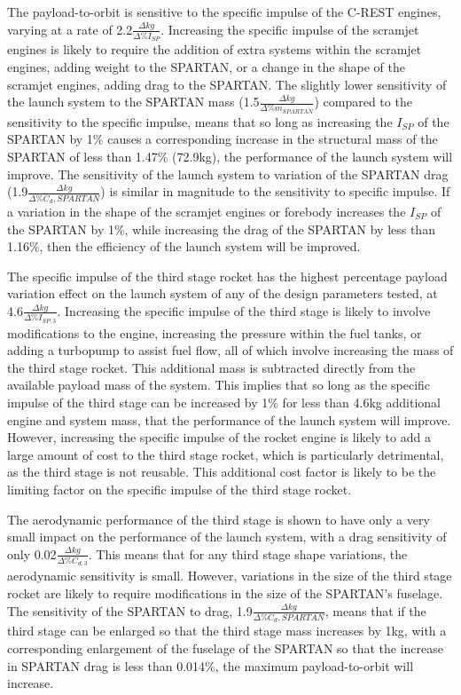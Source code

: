 The payload-to-orbit is sensitive to the specific impulse of the C-REST engines, varying at a rate of 2.2$\frac{\Delta kg}{\Delta\%I_{SP}}$. Increasing the specific impulse of the scramjet engines is likely to require the addition of extra systems within the scramjet engines, adding weight to the SPARTAN, or a change in the shape of the scramjet engines, adding drag to the SPARTAN. 
The slightly lower sensitivity of the launch system to the SPARTAN mass (1.5$\frac{\Delta kg}{\Delta\%m_{SPARTAN}}$) compared to the sensitivity to the specific impulse, means that so long as increasing the $I_{SP}$ of the SPARTAN by 1\% causes a corresponding increase in the structural mass of the SPARTAN of less than 1.47\% (72.9kg), the performance of the launch system will improve. 
The sensitivity of the launch system to variation of the SPARTAN drag (1.9$\frac{\Delta kg}{\Delta\%C_d,{SPARTAN}}$) is similar in magnitude to the sensitivity to specific impulse. 
If a variation in the shape of the scramjet engines or forebody increases the $I_{SP}$ of the SPARTAN by 1\%, while increasing the drag of the SPARTAN by less than 1.16\%, then the efficiency of the launch system will be improved. 


 The specific impulse of the third stage rocket has the highest percentage payload variation effect on the launch system of any of the design parameters tested, at 4.6$\frac{\Delta kg}{\Delta\%I_{SP,3}}$. Increasing the specific impulse of the third stage is likely to involve modifications to the engine, increasing the pressure within the fuel tanks, or adding a turbopump to assist fuel flow, all of which involve increasing the mass of the third stage rocket. 
This additional mass is subtracted directly from the available payload mass of the system. This implies that so long as the specific impulse of the third stage can be increased by 1\% for less than 4.6kg additional engine and system mass, that the performance of the launch system will improve. 
However, increasing the specific impulse of the rocket engine is likely to add a large amount of cost to the third stage rocket, which is particularly detrimental, as the third stage is not reusable. This additional cost factor is likely to be the limiting factor on the specific impulse of the third stage rocket. 

 The aerodynamic performance of the third stage is shown to have only a very small impact on the performance of the launch system, with a drag sensitivity of only 0.02$\frac{\Delta kg}{\Delta\%C_{d,3}}$. This means that for any third stage shape variations, the aerodynamic sensitivity is small.
However, variations in the size of the third stage rocket are likely to require modifications in the size of the SPARTAN's fuselage. The sensitivity of the SPARTAN to drag, 1.9$\frac{\Delta kg}{\Delta\%C_d,{SPARTAN}}$, means that if the third stage can be enlarged so that the third stage mass increases by 1kg, with a corresponding enlargement of the fuselage of the SPARTAN so that the increase in SPARTAN drag is less than 0.014\%, the maximum payload-to-orbit will increase. 








